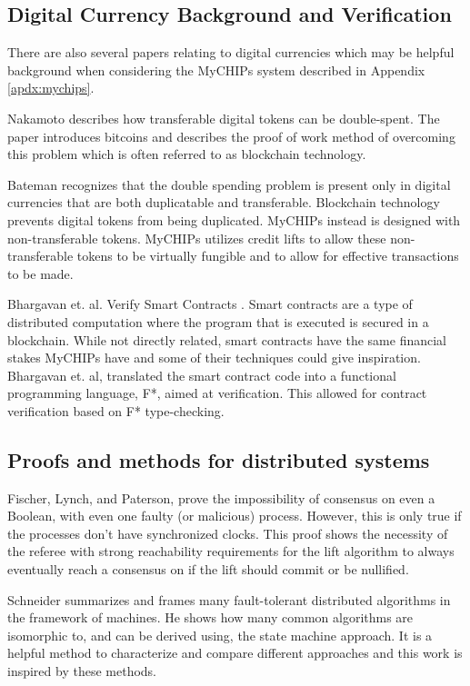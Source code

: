 \documentclass[runningheads]{llncs}
\begin{document}
\subsection{Digital Currency Background and Verification}
There are also several papers relating to digital currencies which may be helpful background when considering the MyCHIPs system described in Appendix \ref{apdx:mychips}.

 Nakamoto describes how transferable digital tokens can be double-spent. The paper introduces bitcoins and describes the proof of work method of overcoming this problem which is often referred to as blockchain technology. \cite{bitcoin} 

 Bateman recognizes that the double spending problem is present only in digital currencies that are both duplicatable and transferable. Blockchain technology prevents digital tokens from being duplicated. MyCHIPs instead is designed with non-transferable tokens. MyCHIPs utilizes credit lifts to allow these non-transferable tokens to be virtually fungible and to allow for effective transactions to be made. 
 
 Bhargavan et. al. Verify Smart Contracts \cite{SmartContracts}. Smart contracts are a type of distributed computation where the program that is executed is secured in a blockchain. While not directly related, smart contracts have the same financial stakes MyCHIPs have and some of their techniques could give inspiration.  Bhargavan et. al, translated the smart contract code into a functional programming language, F*, aimed at verification. This allowed for contract verification based on F* type-checking.

 \subsection{Proofs and methods for distributed systems}
 Fischer, Lynch, and Paterson,\cite{Fischer} prove the impossibility of consensus on even a Boolean, with even one faulty (or malicious) process. However, this is only true if the processes don't have synchronized clocks. This proof shows the necessity of the referee with strong reachability requirements for the lift algorithm to always eventually reach a consensus on if the lift should commit or be nullified.
 
 Schneider summarizes and frames many fault-tolerant distributed algorithms in the framework of  machines\cite{StateMachine}. He shows how many common algorithms are isomorphic to, and can be derived using, the state machine approach. It is a helpful method to characterize and compare different approaches and this work is inspired by these methods.
 
\end{document}
